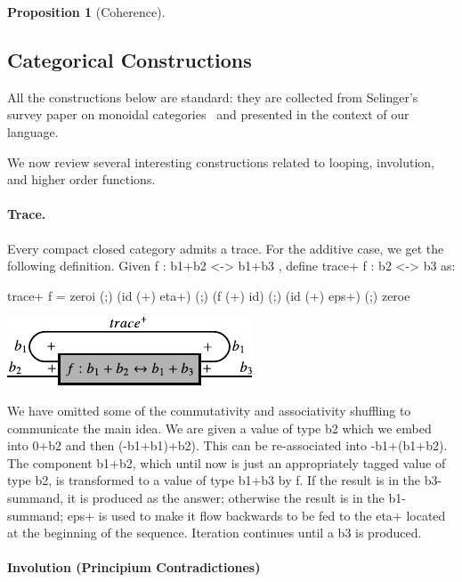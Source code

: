 \documentclass[preprint]{sigplanconf}
\newtheorem{proposition}[theorem]{Proposition}
\begin{document}
\begin{proposition}[Coherence]
  
\end{proposition}


\subsection{Categorical Constructions}

All the constructions below are standard: they are collected from Selinger's
survey paper on monoidal
categories~\cite{springerlink:10.1007/978-3-642-12821-94} and presented in
the context of our language. 

We now review several interesting constructions related to looping,
involution, and higher order functions. 

\paragraph*{Trace.}
Every compact closed category admits a trace. For the additive case, we get
the following definition.  Given {{f : b1+b2 <-> b1+b3 }}, 
define {{trace+ f : b2 <-> b3}} as:

{{ trace+ f = zeroi (;) (id (+) eta+) (;) (f (+) id) (;) (id (+) eps+) (;) zeroe }} 

\begin{center}
  \includegraphics{diagrams/thesis/trace_plus.pdf}
\end{center}  

\noindent We have omitted some of the commutativity and associativity
shuffling to communicate the main idea. We are given a value of type
{{b2}} which we embed into {{0+b2}} and then {{(-b1+b1)+b2)}}. This
can be re-associated into {{-b1+(b1+b2)}}. The component {{b1+b2}},
which until now is just an appropriately tagged value of type {{b2}},
is transformed to a value of type {{b1+b3}} by {{f}}. 
If the result is in the {{b3}}-summand, it is produced as
the answer; otherwise the result is in the {{b1}}-summand; {{eps+}} is
used to make it flow backwards to be fed to the {{eta+}} located at
the beginning of the sequence. Iteration continues until a {{b3}} is
produced.


\paragraph*{Involution (Principium Contradictiones)}
\end{document}
